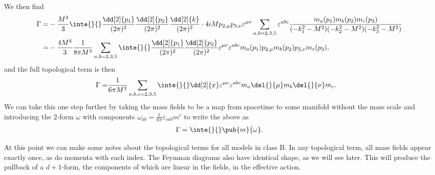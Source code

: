We then find
\begin{align*}
	\Gamma =& -\frac{M^{3}}{3}\inte{}{}\frac{\dd[2]{p_{1}}}{(2\pi)^{2}}\frac{\dd[2]{p_{2}}}{(2\pi)^{2}}\frac{\dd[2]{k}}{(2\pi)^{2}}\cdot 4iMp_{2, \mu}p_{3, \nu}\varepsilon^{\mu\nu}\sum\limits_{a, b = 2, 3, 5}\varepsilon^{abc}\frac{m_{a}(p_{1})m_{b}(p_{2})m_{c}(p_{3})}{(-k_{1}^{2} - M^{2})(-k_{2}^{2} - M^{2})(-k_{3}^{2} - M^{2})} \\
	       =& -\frac{4M^{4}}{3}\frac{1}{8\pi M^{4}}\sum\limits_{a, b = 2, 3, 5}\inte{}{}\frac{\dd[2]{p_{1}}}{(2\pi)^{2}}\frac{\dd[2]{p_{2}}}{(2\pi)^{2}}\varepsilon^{\mu\nu}\varepsilon^{abc}m_{a}(p_{1})p_{2, \mu}m_{b}(p_{2})p_{3, \nu}m_{c}(p_{3}),
\end{align*}
and the full topological term is then
\begin{align*}
	\Gamma =& \frac{1}{6\pi M^{3}}\sum\limits_{a, b, c = 2, 3, 5}\inte{}{}\dd[2]{x}\varepsilon^{\mu\nu}\varepsilon^{abc}m_{a}\del{}{\mu}m_{b}\del{}{\nu}m_{c}.
\end{align*}
We can take this one step further by taking the mass fields to be a map from spacetime to some manifold without the mass scale and introducing the 2-form $\omega$ with components $\omega_{ab} = \frac{1}{6\pi}\varepsilon_{cab}m^{c}$ to write the above as
\begin{align*}
	\Gamma = \inte{}{}\pub{m}{\omega}.
\end{align*}

At this point we can make some notes about the topological terms for all models in class B. In any topological term, all mass fields appear exactly once, as do momenta with each index. The Feynman diagrams also have identical shape, as we will see later. This will produce the pullback of a $d + 1$-form, the components of which are linear in the fields, in the effective action.

